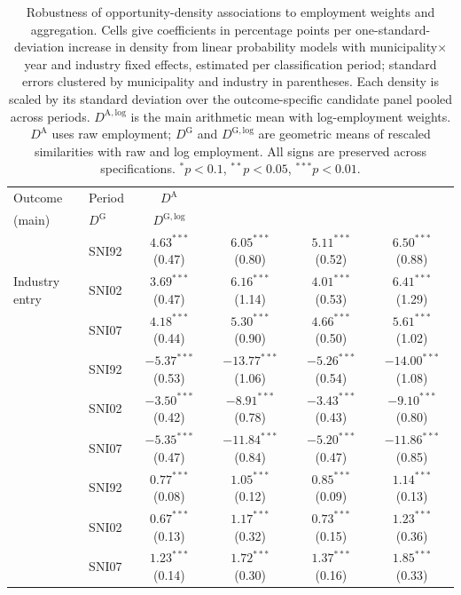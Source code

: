 \documentclass[9pt,twoside]{pnas-new}
\begin{document}
\begin{table}[H]
\centering
\small
\setlength{\tabcolsep}{4pt}
\caption{Robustness of opportunity-density associations to employment weights and aggregation. Cells give coefficients in percentage points per one-standard-deviation increase in density from linear probability models with municipality$\times$year and industry fixed effects, estimated per classification period; standard errors clustered by municipality and industry in parentheses. Each density is scaled by its standard deviation over the outcome-specific candidate panel pooled across periods. $D^{\mathrm{A,log}}$ is the main arithmetic mean with log-employment weights. $D^{\mathrm{A}}$ uses raw employment; $D^{\mathrm{G}}$ and $D^{\mathrm{G,log}}$ are geometric means of rescaled similarities with raw and log employment. All signs are preserved across specifications. $^{*}p<0.1$, $^{**}p<0.05$, $^{***}p<0.01$.}
\label{tab:density_robustness}
\begin{tabular}{llcccc}
\toprule
Outcome & Period & $D^{\mathrm{A}}$ & \shortstack{$D^{\mathrm{A,log}}$\\(main)} & $D^{\mathrm{G}}$ & $D^{\mathrm{G,log}}$ \\
\midrule
\multirow{3}{*}{Industry entry}
 & SNI92 & $4.63^{***}$ (0.47) & $\mathbf{6.05^{***}}$ (0.80) & $5.11^{***}$ (0.52) & $6.50^{***}$ (0.88) \\
 & SNI02 & $3.69^{***}$ (0.47) & $\mathbf{6.16^{***}}$ (1.14) & $4.01^{***}$ (0.53) & $6.41^{***}$ (1.29) \\
 & SNI07 & $4.18^{***}$ (0.44) & $\mathbf{5.30^{***}}$ (0.90) & $4.66^{***}$ (0.50) & $5.61^{***}$ (1.02) \\
\addlinespace
\multirow{3}{*}{Industry exit}
 & SNI92 & $-5.37^{***}$ (0.53) & $\mathbf{-13.77^{***}}$ (1.06) & $-5.26^{***}$ (0.54) & $-14.00^{***}$ (1.08) \\
 & SNI02 & $-3.50^{***}$ (0.42) & $\mathbf{-8.91^{***}}$ (0.78) & $-3.43^{***}$ (0.43) & $-9.10^{***}$ (0.80) \\
 & SNI07 & $-5.35^{***}$ (0.47) & $\mathbf{-11.84^{***}}$ (0.84) & $-5.20^{***}$ (0.47) & $-11.86^{***}$ (0.85) \\
\addlinespace
\multirow{3}{*}{Startup formation}
 & SNI92 & $0.77^{***}$ (0.08) & $\mathbf{1.05^{***}}$ (0.12) & $0.85^{***}$ (0.09) & $1.14^{***}$ (0.13) \\
 & SNI02 & $0.67^{***}$ (0.13) & $\mathbf{1.17^{***}}$ (0.32) & $0.73^{***}$ (0.15) & $1.23^{***}$ (0.36) \\
 & SNI07 & $1.23^{***}$ (0.14) & $\mathbf{1.72^{***}}$ (0.30) & $1.37^{***}$ (0.16) & $1.85^{***}$ (0.33) \\
\bottomrule
\end{tabular}
\end{table}
\end{document}
